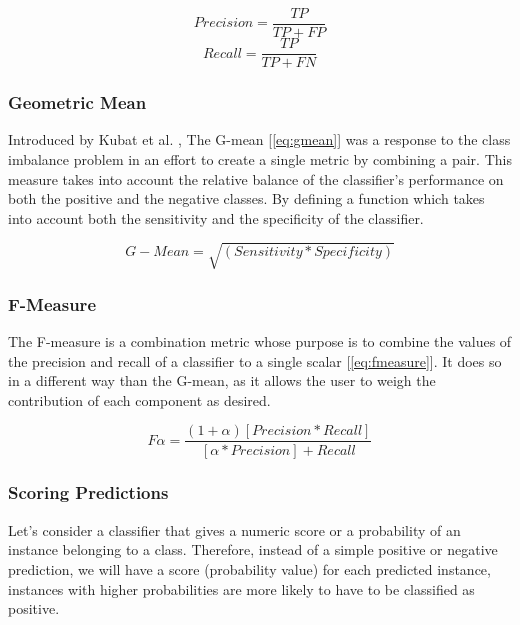 \begin{equation}
    Precision = \frac{TP}{TP+FP} 
    \label{eq:precision}
\end{equation}
\begin{equation}
    Recall = \frac{TP}{TP+FN} 
    \label{eq:recall}
\end{equation}

\subsubsection{Geometric Mean}
Introduced by Kubat et al. \cite{kubat1998machine}, The G-mean [\ref{eq:gmean}] was a response to the class 
imbalance problem in an effort to create a single metric by combining a pair. This measure takes 
into account the relative balance of the classifier’s performance on both the positive and the 
negative classes. By defining a function which takes into account both the sensitivity and the 
specificity of the classifier.

\begin{equation}
    G-Mean = \sqrt{(Sensitivity*Specificity)}
    \label{eq:gmean}
\end{equation}

\subsubsection{F-Measure}
The F-measure is a combination metric whose purpose is to combine the values of the precision and 
recall of a classifier to a single scalar [\ref{eq:fmeasure}]. It does so in a different way than the G-mean, 
as it allows the user to weigh the contribution of each component as desired.

\begin{equation}
    F \alpha = \frac{(1+\alpha)[Precision*Recall]}{[\alpha*Precision]+Recall} 
    \label{eq:fmeasure}
\end{equation}

\subsubsection{Scoring Predictions}

Let’s consider a classifier that gives a numeric score or a probability of an instance belonging to a 
class. Therefore, instead of a simple positive or negative prediction, we will have a score 
(probability value) for each predicted instance, instances with higher probabilities are more 
likely to have to be classified as positive.

